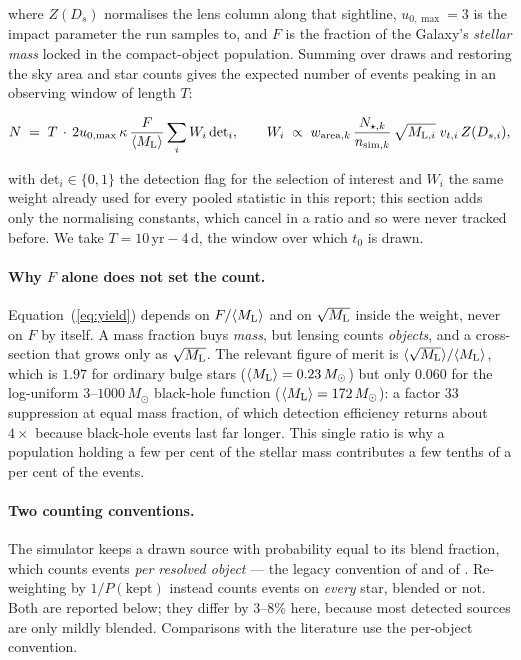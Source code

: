 \documentclass[english,10pt,a4paper]{article}
\newcommand{\Ml}{M_{\rm L}}
\newcommand{\Msun}{M_\odot}
\begin{document}
where $Z(D_s)$ normalises the lens column along that sightline, $u_{0,\max}=3$ is the impact
parameter the run samples to, and $F$ is the fraction of the Galaxy's \emph{stellar mass} locked
in the compact-object population. Summing over draws and restoring the sky area and star counts
gives the expected number of events peaking in an observing window of length $T$:

\begin{equation}
N \;=\; T\,\cdot\,2u_{0,\max}\,\kappa\,\frac{F}{\langle \Ml\rangle}
        \sum_i W_i\,\mathrm{det}_i ,
\qquad
W_i \;\propto\; w_{{\rm area},k}\,\frac{N_{\star,k}}{n_{{\rm sim},k}}\,
                \sqrt{M_{{\rm L},i}}\;v_{t,i}\,Z(D_{s,i}),
\label{eq:yield}
\end{equation}

with $\mathrm{det}_i\in\{0,1\}$ the detection flag for the selection of interest and $W_i$ the same
weight already used for every pooled statistic in this report; this section adds only the
normalising constants, which cancel in a ratio and so were never tracked before. We take $T = 10\,\mathrm{yr} - 4\,\mathrm{d}$,
the window over which $t_0$ is drawn.

\paragraph{Why $F$ alone does not set the count.} Equation~(\ref{eq:yield}) depends on
$F/\langle \Ml\rangle$ and on $\sqrt{\Ml}$ inside the weight, never on $F$ by itself. A mass
fraction buys \emph{mass}, but lensing counts \emph{objects}, and a cross-section that grows only
as $\sqrt{\Ml}$. The relevant figure of merit is $\langle\sqrt{\Ml}\rangle/\langle \Ml\rangle$,
which is $1.97$ for ordinary bulge stars ($\langle \Ml\rangle = 0.23\,\Msun$) but only $0.060$ for
the log-uniform $3$--$1000\,\Msun$ black-hole function ($\langle \Ml\rangle = 172\,\Msun$): a
factor $33$ suppression at equal mass fraction, of which detection efficiency returns about
$4\times$ because black-hole events last far longer. This single ratio is why a population holding
a few per cent of the stellar mass contributes a few tenths of a per cent of the events.

\paragraph{Two counting conventions.} The simulator keeps a drawn source with probability equal to
its blend fraction, which counts events \emph{per resolved object} --- the legacy convention of
\citet{SajadianMakler2026} and of \citet{SajadianSahu2023}. Re-weighting by $1/P(\text{kept})$ instead
counts events on \emph{every} star, blended or not. Both are reported below; they differ by
$3$--$8\%$ here, because most detected sources are only mildly blended. Comparisons with the
literature use the per-object convention.
\end{document}
